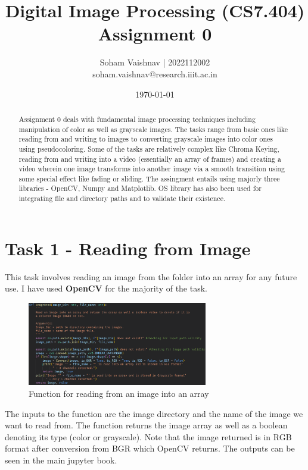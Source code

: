 \documentclass[notitlepage]{report}
\title{Digital Image Processing (CS7.404)\\
Assignment 0}
\author{Soham Vaishnav | 2022112002\\
soham.vaishnav@research.iiit.ac.in}
\date{\today}
\begin{document}
\maketitle

\begin{abstract}
Assignment 0 deals with fundamental image processing techniques including manipulation of color as well as 
grayscale images. The tasks range from basic ones like reading from and writing to images to converting 
grayscale images into color ones using pseudocoloring. Some of the tasks are relatively complex like 
Chroma Keying, reading from and writing into a video (essentially an array of frames) and creating a video 
wherein one image transforms into another image via a smooth transition using some special effect like fading
or sliding. The assingment entails using majorly three libraries - OpenCV, Numpy and Matplotlib. OS library has 
also been used for integrating file and directory paths and to validate their existence.
\end{abstract}

\section{Task 1 - Reading from Image}
This task involves reading an image from the folder into an array for any future use. I have used \textbf{OpenCV}
for the majority of the task.

\begin{figure}[htp]
    \centering
    \hypertarget{C1}{\includegraphics[width = 0.7\textwidth]{C1.png}}
    \caption{Function for reading from an image into an array}
    \label{fig1:sysfig}
\end{figure}

The inputs to the function are the image directory and the name of the image we want to read from. The function
returns the image array as well as a boolean denoting its type (color or grayscale). Note that the image returned 
is in RGB format after conversion from BGR which OpenCV returns. The outputs 
can be seen in the main jupyter book. 
\end{document}
